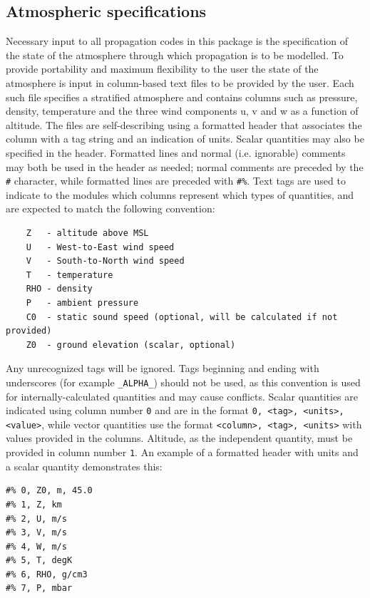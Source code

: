 \subsection{Atmospheric specifications}
\label{sec: AtmoSpecs}
Necessary input to all propagation codes in this package is the specification of the state of the atmosphere through which propagation is to be modelled. To provide portability and maximum flexibility to the user the state of the atmosphere is input in column-based text files to be provided by the user. Each such file specifies a stratified atmosphere and contains columns such as pressure, density, temperature and the three wind components u, v and w as a function of altitude. The files are self-describing using a formatted header that associates the column with a tag string and an indication of units.  Scalar quantities may also be specified in the header.  Formatted lines and normal (i.e. ignorable) comments may both be used in the header as needed; normal comments are preceded by the \verb"#" character, while formatted lines are preceded with \verb"#%".  Text tags are used to indicate to the modules which columns represent which types of quantities, and are expected to match the following convention:

\begin{minipage}{\linewidth}
\begin{verbatim}
    Z   - altitude above MSL
    U   - West-to-East wind speed
    V   - South-to-North wind speed
    T   - temperature
    RHO - density
    P   - ambient pressure
    C0  - static sound speed (optional, will be calculated if not provided)
    Z0  - ground elevation (scalar, optional)
\end{verbatim}
\end{minipage}

\noindent Any unrecognized tags will be ignored. Tags beginning and ending with underscores (for example \verb"_ALPHA_") should not be used, as this convention is used for internally-calculated quantities and may cause conflicts. Scalar quantities are indicated using column number \verb"0" and are in the format \verb"0, <tag>, <units>, <value>", while vector quantities use the format \verb"<column>, <tag>, <units>" with values provided in the columns.  Altitude, as the independent quantity, must be provided in column number \verb"1".  An example of a formatted header with units and a scalar quantity demonstrates this:

\begin{minipage}{\linewidth}
\begin{verbatim}
#% 0, Z0, m, 45.0
#% 1, Z, km
#% 2, U, m/s
#% 3, V, m/s
#% 4, W, m/s
#% 5, T, degK
#% 6, RHO, g/cm3
#% 7, P, mbar
\end{verbatim}
\end{minipage}

